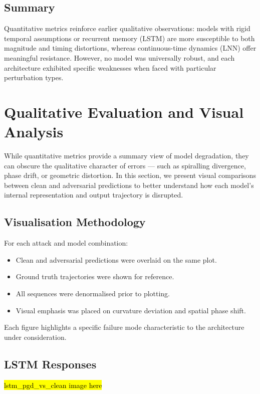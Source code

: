 \subsection{Summary}
Quantitative metrics reinforce earlier qualitative observations: models with rigid temporal assumptions or recurrent memory (LSTM) are more susceptible to both magnitude and timing distortions, whereas continuous-time dynamics (LNN) offer meaningful resistance. However, no model was universally robust, and each architecture exhibited specific weaknesses when faced with particular perturbation types.

\section{Qualitative Evaluation and Visual Analysis}

While quantitative metrics provide a summary view of model degradation, they can obscure the qualitative character of errors — such as spiralling divergence, phase drift, or geometric distortion. In this section, we present visual comparisons between clean and adversarial predictions to better understand how each model’s internal representation and output trajectory is disrupted.

\subsection{Visualisation Methodology}

For each attack and model combination:
\begin{itemize}
    \item Clean and adversarial predictions were overlaid on the same plot.
    \item Ground truth trajectories were shown for reference.
    \item All sequences were denormalised prior to plotting.
    \item Visual emphasis was placed on curvature deviation and spatial phase shift.
\end{itemize}

Each figure highlights a specific failure mode characteristic to the architecture under consideration.

\subsection{LSTM Responses}

\hl{lstm\_pgd\_vs\_clean image here}

